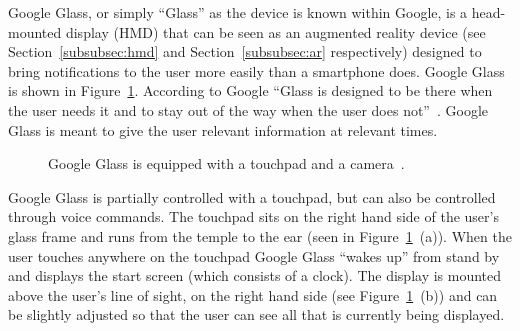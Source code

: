 Google Glass, or simply ``Glass'' as the device is known within Google, is a head-mounted display (HMD) that can be seen as an augmented reality device (see Section~\ref{subsubsec:hmd} and Section~\ref{subsubsec:ar} respectively) designed to bring notifications to the user more easily than a smartphone does. Google Glass is shown in Figure~\ref{GoogleGlassHardware}. According to Google ``Glass is designed to be there when the user needs it and to stay out of the way when the user does not''~\cite{glassDesignPrinciples}. Google Glass is meant to give the user relevant information at relevant times.

	\begin{figure}[ht!]
		\centering
    \qquad
    \qquad
		\caption{Google Glass is equipped with a touchpad and a camera~\cite{ImagesGoogleGlassUI}.}
		\label{GoogleGlassHardware}
	\end{figure}

Google Glass is partially controlled with a touchpad, but can also be controlled through voice commands. The touchpad sits on the right hand side of the user's glass frame and runs from the temple to the ear (seen in Figure~\ref{GoogleGlassHardware}~(a)). When the user touches anywhere on the touchpad Google Glass ``wakes up'' from stand by and displays the start screen (which consists of a clock). The display is mounted above the user's line of sight, on the right hand side (see Figure~\ref{GoogleGlassHardware}~(b)) and can be slightly adjusted so that the user can see all that is currently being displayed.

